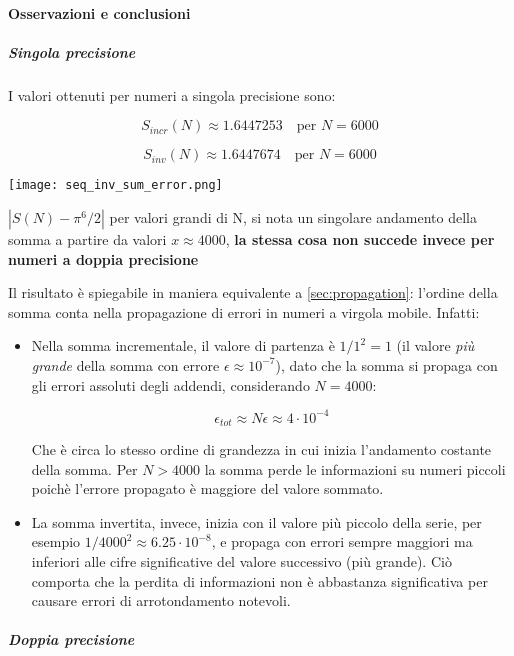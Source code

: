 \paragraph{Osservazioni e conclusioni}

\subparagraph{Singola precisione}

I valori ottenuti per numeri a singola precisione sono:

$$
	S_{incr}(N) \approx \mathtt{1.6447253} \quad \text{per } N = 6000
$$

$$
	S_{inv}(N) \approx \mathtt{1.6447674} \quad \text{per } N = 6000
$$

\begin{marginfigure}%
	\texttt{[image: seq\_inv\_sum\_error.png]}
	\caption{$|S(N) - \pi^6 / 2|$ per valori grandi di N, si nota un singolare
		andamento della somma a partire da valori $ x \approx 4000$, \textbf{la
			stessa cosa non succede invece per numeri a doppia precisione}}
\end{marginfigure}

Il risultato è spiegabile in maniera equivalente a \ref{sec:propagation}: l'ordine
della somma conta nella propagazione di errori in numeri a virgola mobile. Infatti:
\begin{itemize}
	\item Nella somma incrementale, il valore di partenza è $1/1^2 = 1$ (il valore
	      \textit{più grande} della somma con errore $\epsilon \approx 10^{-7}$),
	      dato che la somma si propaga con gli errori assoluti degli addendi,
	      considerando $N = 4000$:

	      $$\epsilon_{tot} \approx N \epsilon \approx 4 \cdot 10^{-4}$$

	      Che è circa lo stesso ordine di grandezza in cui inizia l'andamento costante
	      della somma. Per $N > 4000$ la somma perde le informazioni su numeri piccoli
	      poichè l'errore propagato è maggiore del valore sommato.

	\item La somma invertita, invece, inizia con il valore più piccolo della serie,
	      per esempio $1/4000^2 \approx 6.25 \cdot 10^{-8}$, e propaga con errori sempre maggiori
	      ma inferiori alle cifre significative del valore successivo (più grande).
	      Ciò comporta che la perdita di informazioni non è abbastanza significativa
	      per causare errori di arrotondamento notevoli.
\end{itemize}
\subparagraph{Doppia precisione}

